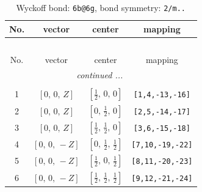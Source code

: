 \documentclass[fleqn,8pt]{jsarticle}
\begin{document}
\renewcommand{\arraystretch}{1.2}
\begin{longtable}{cccc}
\caption{Wyckoff bond: {\tt 6b@6g}, bond symmetry: {\tt 2/m..}}
 \\
 \hline \hline
No. & vector & center & mapping \\ \hline \endfirsthead

\multicolumn{3}{l}{\tablename\ \thetable{}} \\
 \hline \hline
No. & vector & center & mapping \\ \hline \endhead

 \hline \hline
\multicolumn{3}{r}{\footnotesize\it continued ...} \\ \endfoot

 \hline \hline
\multicolumn{3}{r}{} \\ \endlastfoot

1 & $\left[ 0,\, 0,\, Z \right]$ & $\left[ \frac{1}{2},\, 0,\, 0 \right]$ & {\tt [1,4,-13,-16]} \\ \hline
2 & $\left[ 0,\, 0,\, Z \right]$ & $\left[ 0,\, \frac{1}{2},\, 0 \right]$ & {\tt [2,5,-14,-17]} \\ \hline
3 & $\left[ 0,\, 0,\, Z \right]$ & $\left[ \frac{1}{2},\, \frac{1}{2},\, 0 \right]$ & {\tt [3,6,-15,-18]} \\ \hline
4 & $\left[ 0,\, 0,\, - Z \right]$ & $\left[ 0,\, \frac{1}{2},\, \frac{1}{2} \right]$ & {\tt [7,10,-19,-22]} \\ \hline
5 & $\left[ 0,\, 0,\, - Z \right]$ & $\left[ \frac{1}{2},\, 0,\, \frac{1}{2} \right]$ & {\tt [8,11,-20,-23]} \\ \hline
6 & $\left[ 0,\, 0,\, - Z \right]$ & $\left[ \frac{1}{2},\, \frac{1}{2},\, \frac{1}{2} \right]$ & {\tt [9,12,-21,-24]} \\
\end{longtable}
\renewcommand{\arraystretch}{1.2}
\end{document}
